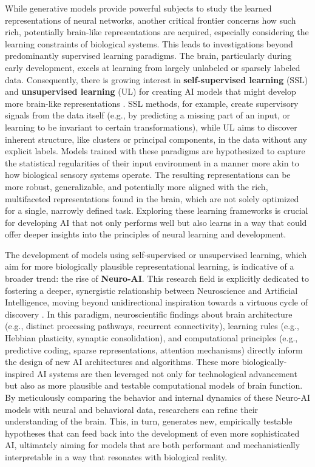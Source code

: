 While generative models provide powerful subjects to study the learned representations of neural networks, another critical frontier concerns how such rich, potentially brain-like representations are acquired, especially considering the learning constraints of biological systems. This leads to investigations beyond predominantly supervised learning paradigms. The brain, particularly during early development, excels at learning from largely unlabeled or sparsely labeled data. Consequently, there is growing interest in \textbf{self-supervised learning} (SSL) and \textbf{unsupervised learning} (UL) for creating AI models that might develop more brain-like representations \cite{richards2019deep}. SSL methods, for example, create supervisory signals from the data itself (e.g., by predicting a missing part of an input, or learning to be invariant to certain transformations), while UL aims to discover inherent structure, like clusters or principal components, in the data without any explicit labels. Models trained with these paradigms are hypothesized to capture the statistical regularities of their input environment in a manner more akin to how biological sensory systems operate. The resulting representations can be more robust, generalizable, and potentially more aligned with the rich, multifaceted representations found in the brain, which are not solely optimized for a single, narrowly defined task. Exploring these learning frameworks is crucial for developing AI that not only performs well but also learns in a way that could offer deeper insights into the principles of neural learning and development.

The development of models using self-supervised or unsupervised learning, which aim for more biologically plausible representational learning, is indicative of a broader trend: the rise of \textbf{Neuro-AI}. This research field is explicitly dedicated to fostering a deeper, synergistic relationship between Neuroscience and Artificial Intelligence, moving beyond unidirectional inspiration towards a virtuous cycle of discovery \cite{richards2019deep, kriegeskorte2018cognitive}. In this paradigm, neuroscientific findings about brain architecture (e.g., distinct processing pathways, recurrent connectivity), learning rules (e.g., Hebbian plasticity, synaptic consolidation), and computational principles (e.g., predictive coding, sparse representations, attention mechanisms) directly inform the design of new AI architectures and algorithms. These more biologically-inspired AI systems are then leveraged not only for technological advancement but also as more plausible and testable computational models of brain function. By meticulously comparing the behavior and internal dynamics of these Neuro-AI models with neural and behavioral data, researchers can refine their understanding of the brain. This, in turn, generates new, empirically testable hypotheses that can feed back into the development of even more sophisticated AI, ultimately aiming for models that are both performant and mechanistically interpretable in a way that resonates with biological reality.

